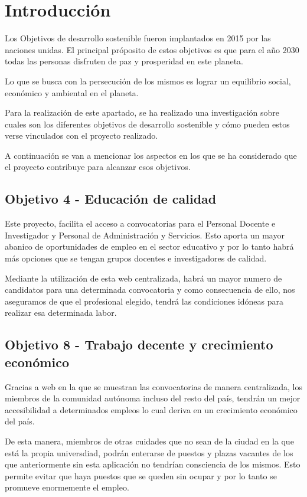 
\section{Introducción}
Los Objetivos de desarrollo sostenible fueron implantados en 2015 por las naciones unidas. El principal próposito de estos objetivos es que para el año 2030 todas las personas disfruten de paz y prosperidad en este planeta.

Lo que se busca con la persecución de los mismos es lograr un equilibrio social, económico y ambiental en el planeta.

Para la realización de este apartado, se ha realizado una investigación sobre cuales son los diferentes objetivos de desarrollo sostenible y cómo pueden estos verse vinculados con el proyecto realizado.

A continuación se van a mencionar los aspectos en los que se ha considerado que el proyecto contribuye para alcanzar esos objetivos.

\subsection{Objetivo 4 - Educación de calidad}
Este proyecto, facilita el acceso a convocatorias para el Personal Docente e Investigador y Personal de Administración y Servicios. Esto aporta un mayor abanico de oportunidades de empleo en el sector educativo y por lo tanto habrá más opciones que se tengan grupos docentes e investigadores de calidad.

Mediante la utilización de esta web centralizada, habrá un mayor numero de candidatos para una determinada convocatoria y como consecuencia de ello, nos aseguramos de que el profesional elegido, tendrá las condiciones idóneas para realizar esa determinada labor.


\subsection{Objetivo 8 - Trabajo decente y crecimiento económico}

Gracias a web en la que se muestran las convocatorias de manera centralizada, los miembros de la comunidad autónoma incluso del resto del país, tendrán un mejor accesibilidad a determinados empleos lo cual deriva en un crecimiento económico del país.

De esta manera, miembros de otras cuidades que no sean de la ciudad en la que está la propia universdiad, podrán enterarse de puestos y plazas vacantes de los que anteriormente sin esta aplicación no tendrían consciencia de los mismos. Esto permite evitar que haya puestos que se queden sin ocupar y por lo tanto se promueve enormemente el empleo.

